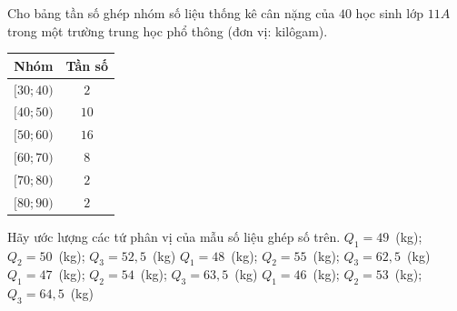 \begin{ex}%
	Cho bảng tần số ghép nhóm số liệu thống kê cân nặng của $40$ học sinh  lớp $11A$ trong một trường trung học phổ thông (đơn vị: kilôgam).
	\begin{center}
		\begin{tabular}{|c|c|}
			 \hline
			Nhóm  & Tần số \\
			 \hline
			$[30; 40)$ &  $2$ \\
			\hline 
			$[40; 50)$  & $10$ \\
			\hline 
			$[50; 60)$ & $16$  \\
			\hline 
			$[60; 70)$ & $8$  \\
			 \hline
			$[70;  80)$ & $2$ \\
			\hline 
			$[80; 90)$ & $2$ \\ 
			 \hline
		\end{tabular}
	\end{center}
	Hãy ước lượng các tứ  phân vị của mẫu số liệu ghép số trên.
	\choice 
		{$Q_{1}=49$~(kg);  $Q_{2}=50$~(kg); $Q_{3}=52{,}5$~(kg)}
		{\True  $Q_{1}=48$~(kg); $Q_{2}=55$~(kg); $Q_{3}=62{,}5$~(kg)}
		{$Q_{1}=47$~(kg);  $Q_{2}=54$~(kg); $Q_{3}=63{,}5$~(kg)}
		{$Q_{1}=46$~(kg); $Q_{2}=53$~(kg);  $Q_{3}=64{,}5$~(kg)}
\end{ex}

